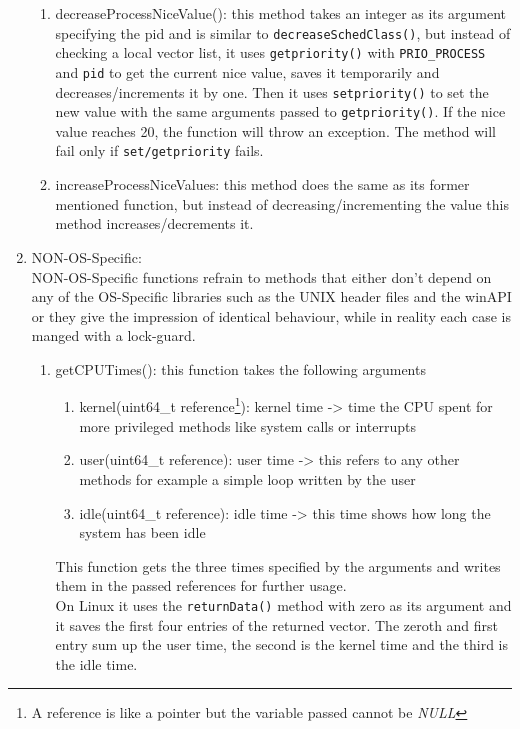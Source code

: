 \begin{enumerate}
\begin{enumerate}
		\item decreaseProcessNiceValue(): this method takes an integer as its argument specifying the pid and is similar to \texttt{decreaseSchedClass()}, but instead of checking a local vector list, it uses \texttt{getpriority()} with \texttt{PRIO\_PROCESS} and \texttt{pid} to get the current nice value, saves it temporarily and decreases/increments it by one. Then it uses \texttt{setpriority()} to set the new value with the same arguments passed to \texttt{getpriority()}. If the nice value reaches 20, the function will throw an exception. The method will fail only if \texttt{set/getpriority} fails.
		\item increaseProcessNiceValues: this method does the same as its former mentioned function, but instead of decreasing/incrementing the value this method increases/decrements it.
	\end{enumerate}
	\item NON-OS-Specific:\\
	NON-OS-Specific functions refrain to methods that either don't depend on any of the OS-Specific libraries such as the UNIX header files and the winAPI or they give the impression of identical behaviour, while in reality each case is manged with a lock-guard. 
	\begin{enumerate}
		\item getCPUTimes(): this function takes the following arguments
		\begin{enumerate}
			\item kernel(uint64\_t reference\footnote{A reference is like a pointer but the variable passed cannot be \textit{NULL}}): kernel time -> time the CPU spent for more \dq privileged\dq{} methods like system calls or interrupts
			\item user(uint64\_t reference): user time -> this refers to any other methods for example a simple loop written by the user
			\item idle(uint64\_t reference): idle time -> this time shows how long the system has been idle 
		\end{enumerate}
		This function gets the three times specified by the arguments and writes them in the passed references for further usage.\\
		On Linux it uses the \texttt{returnData()} method with zero as its argument and it saves the first four entries of the returned vector. The zeroth and first entry sum up the user time, the second is the kernel time and the third is the idle time.\\

\end{enumerate}
\end{enumerate}
